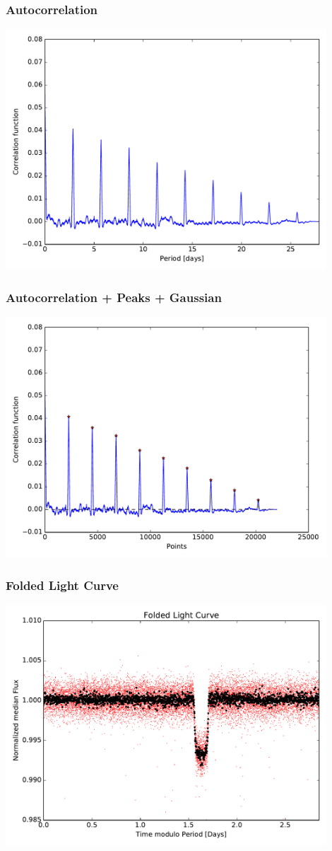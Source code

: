 \documentclass[notes]{beamer}
\begin{document}
\begin{frame}
\frametitle{Autocorrelation}
\centering
\includegraphics[width=0.9\textwidth]{../figures/2018-11-19_14:46:56_correlation_fig0.pdf}
\end{frame}

\begin{frame}
\frametitle{Autocorrelation + Peaks + Gaussian}
\centering
\includegraphics[width=0.9\textwidth]{../figures/2018-11-20_11:12:6_peaks_fig0.pdf}
\end{frame}

\begin{frame}
\frametitle{Folded Light Curve}
\centering
\includegraphics[width=0.9\textwidth]{../figures/2018-11-27_12:41:56_Folded0.pdf}
\end{frame}
\end{document}

